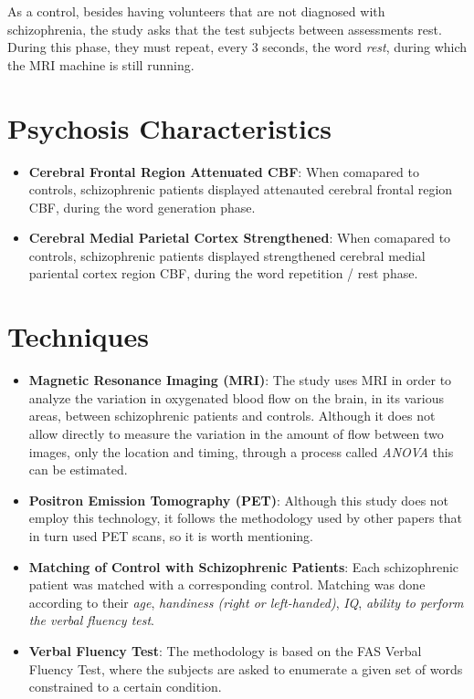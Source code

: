 \documentclass{Paper_Summary}
\begin{document}
    As a control, besides having volunteers that are not diagnosed with schizophrenia, the study asks that the test subjects between assessments rest. During this phase, they must repeat, every 3 seconds, the word \emph{rest}, during which the MRI machine is still running. 

\breakline

\newpage

\section{Psychosis Characteristics}
    \begin{itemize}
        \item \textbf{Cerebral Frontal Region Attenuated CBF}: When comapared to controls, schizophrenic patients displayed attenauted cerebral frontal region CBF, during the word generation phase.
        \item \textbf{Cerebral Medial Parietal Cortex Strengthened}: When comapared to controls, schizophrenic patients displayed strengthened cerebral medial pariental cortex region CBF, during the word repetition / rest phase.
    \end{itemize}

\section{Techniques}
    \begin{itemize}
        \item \textbf{Magnetic Resonance Imaging (MRI)}: The study uses MRI in order to analyze the variation in oxygenated blood flow on the brain, in its various areas, between schizophrenic patients and controls. Although it does not allow directly to measure the variation in the amount of flow between two images, only the location and timing, through a process called \emph{ANOVA} this can be estimated.
        \item \textbf{Positron Emission Tomography (PET)}: Although this study does not employ this technology, it follows the methodology used by other papers that in turn used PET scans, so it is worth mentioning.
        \item \textbf{Matching of Control with Schizophrenic Patients}: Each schizophrenic patient was matched with a corresponding control. Matching was done according to their \emph{age}, \emph{handiness (right or left-handed)}, \emph{IQ}, \emph{ability to perform the verbal fluency test}.
        \item \textbf{Verbal Fluency Test}: The methodology is based on the FAS Verbal Fluency Test, where the subjects are asked to enumerate a given set of words constrained to a certain condition.
        
    \end{itemize}
\end{document}
